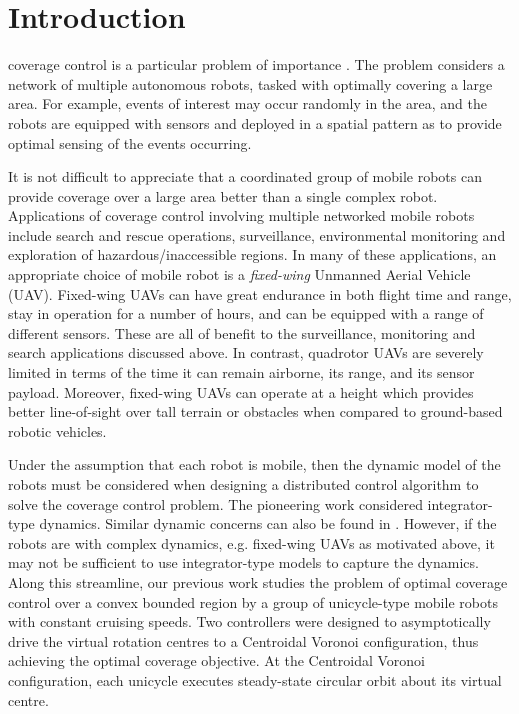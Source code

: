 \documentclass[journal]{IEEEtran}
\begin{document}
	\section{Introduction}
	
	{\color{blue}
		 coverage control is a particular problem of importance \cite{Cortes}. The problem considers a network of multiple autonomous robots, tasked with optimally covering a large area. For example, events of interest may occur randomly in the area, and the robots are equipped with sensors and deployed in a spatial pattern as to provide optimal sensing of the events occurring. 
		
		It is not difficult to appreciate that a coordinated group of mobile robots can provide coverage over a large area better than a single complex robot. Applications of coverage control involving multiple networked mobile robots include search and rescue operations, surveillance, environmental monitoring and exploration of hazardous/inaccessible regions. In many of these applications, an appropriate choice of mobile robot is a \textit{fixed-wing} Unmanned Aerial Vehicle (UAV). Fixed-wing UAVs can have great endurance in both flight time and range, stay in operation for a number of hours, and can be equipped with a range of different sensors. These are all of benefit to the surveillance, monitoring and search applications discussed above. In contrast, quadrotor UAVs are severely limited in terms of the time it can remain airborne, its range, and its sensor payload. Moreover, fixed-wing UAVs can operate at a height which provides better line-of-sight over tall terrain or obstacles when compared to ground-based robotic vehicles. 
		
		Under the assumption that each robot is mobile, then the dynamic model of the robots must be considered when designing a distributed control algorithm to solve the coverage control problem. The pioneering work \cite{Cortes} considered integrator-type dynamics. Similar dynamic concerns can also be found in \cite{Schwager}. However, if the robots are with complex dynamics, e.g. fixed-wing UAVs as motivated above, it may not be sufficient to use integrator-type models to capture the dynamics. Along this streamline, our previous work \cite{Qingchen} studies the problem of optimal coverage control over a convex bounded region by a group of unicycle-type mobile robots with constant cruising speeds. Two controllers were designed to asymptotically drive the virtual rotation centres to a Centroidal Voronoi configuration, thus achieving the optimal coverage objective. At the Centroidal Voronoi configuration, each unicycle executes steady-state circular orbit about its virtual centre.
		
}
\end{document}
